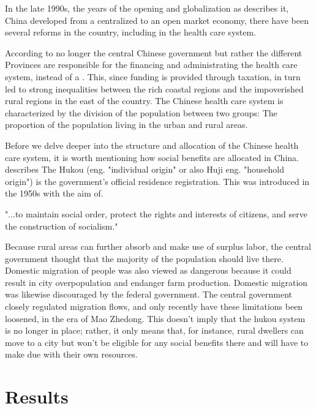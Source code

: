 \documentclass[
]{article}
\begin{document}
In the late 1990s, the years of the opening and globalization as \textcite{kanbur_fifty_2005} describes it, China developed from a centralized to an open market economy, there have been several reforms in the country, including in the health care system. 

According to \textcite{hougaard_chinese_2011} no longer the central Chinese government but rather the different Provinces are responsible for the financing and administrating the health care system, instead of a . This, since funding is provided through taxation, in turn led to strong inequalities between the rich coastal regions and the impoverished rural regions in the east of the country. The Chinese health care system is characterized by the division of the population between two groups: The proportion of the population living in the urban and rural areas. 

Before we delve deeper into the structure and allocation of the Chinese health care system, it is worth mentioning how social benefits are allocated in China. \cite{liu_institution_2005} describes The Hukou (eng. "individual origin" or also Huji eng. "household origin") is the government's official residence registration. This was introduced in the 1950s with the aim of. 

"...to maintain social order, protect the rights and interests of citizens, and serve the construction of socialism."

Because rural areas can further absorb and make use of surplus labor, the central government thought that the majority of the population should live there.
Domestic migration of people was also viewed as dangerous because it could result in city overpopulation and endanger farm production.
Domestic migration was likewise discouraged by the federal government.
The central government closely regulated migration flows, and only recently have these limitations been loosened, in the era of Mao Zhedong. This doesn't imply that the hukou system is no longer in place; rather, it only means that, for instance, rural dwellers can move to a city but won't be eligible for any social benefits there and will have to make due with their own resources.


\section{Results}
\end{document}
